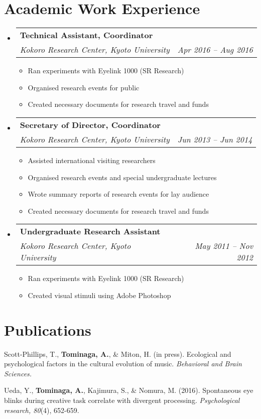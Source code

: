 \documentclass[letterpaper,11pt]{article}
\makeatletter
\newcommand{\resumeItem}[1]{
  \item\small{
    {#1 \vspace{-2pt}}
  }
}
\newcommand{\resumeSubheading}[4]{
  \vspace{-2pt}\item
    \begin{tabular*}{0.97\textwidth}[t]{l@{\extracolsep{\fill}}r}
      \textbf{#1} & #2 \\
      \textit{\small#3} & \textit{\small #4} \\
    \end{tabular*}\vspace{-7pt}
}
\newcommand{\resumeSubHeadingListStart}{\begin{itemize}[leftmargin=0.15in, label={}]}
\newcommand{\resumeSubHeadingListEnd}{\end{itemize}}
\newcommand{\resumeItemListStart}{\begin{itemize}}
\newcommand{\resumeItemListEnd}{\end{itemize}\vspace{-5pt}}
\makeatother
\begin{document}
\section{Academic Work Experience}
\resumeSubHeadingListStart
    \resumeSubheading
      {Technical Assistant, Coordinator}{ }
      {Kokoro Research Center, Kyoto University}{Apr 2016 -- Aug 2016}
      \resumeItemListStart
        \resumeItem{Ran experiments with Eyelink 1000 (SR Research)}
        \resumeItem{Organised research events for public}
        \resumeItem{Created necessary documents for research travel and funds}
      \resumeItemListEnd
    \resumeSubheading
      {Secretary of Director, Coordinator}{ }
      {Kokoro Research Center, Kyoto University}{Jun 2013 -- Jun 2014}
      \resumeItemListStart
        \resumeItem{Assisted international visiting researchers}
        \resumeItem{Organised research events and special undergraduate lectures}
        \resumeItem{Wrote summary reports of research events for lay audience}
        \resumeItem{Created necessary documents for research travel and funds}
      \resumeItemListEnd
    \resumeSubheading
      {Undergraduate Research Assistant}{ }
      {Kokoro Research Center, Kyoto University}{May 2011 -- Nov 2012}
      \resumeItemListStart
        \resumeItem{Ran experiments with Eyelink 1000 (SR Research)}
        \resumeItem{Created visual stimuli using Adobe Photoshop}
      \resumeItemListEnd

  \resumeSubHeadingListEnd


\section{Publications}
 \begin{itemize}[leftmargin=0.15in, label={}]
    \small{
        \item{
        {Scott-Phillips, T., \textbf{Tominaga, A.}, \& Miton, H. (in press). Ecological and psychological factors in the cultural evolution of music. \textit{Behavioral and Brain Sciences.} \\
       }}
        \item{
        {Ueda, Y., \textbf{Tominaga, A.}, Kajimura, S., \& Nomura, M. (2016). Spontaneous eye blinks during creative task correlate with divergent processing. \textit{Psychological research, 80}(4), 652-659.} \\
       }} 
 \end{itemize}
\end{document}
